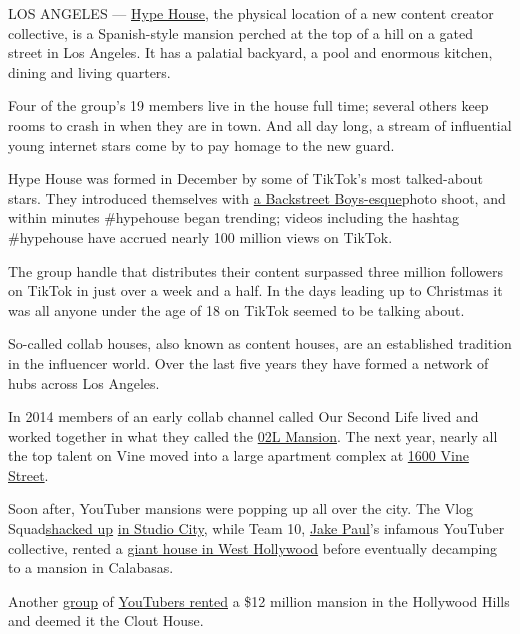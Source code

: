 LOS ANGELES --- \href{https://vm.tiktok.com/CpHWv4/}{Hype House}, the
physical location of a new content creator collective, is a
Spanish-style mansion perched at the top of a hill on a gated street in
Los Angeles. It has a palatial backyard, a pool and enormous kitchen,
dining and living quarters.

Four of the group's 19 members live in the house full time; several
others keep rooms to crash in when they are in town. And all day long, a
stream of influential young internet stars come by to pay homage to the
new guard.

Hype House was formed in December by some of TikTok's most talked-about
stars. They introduced themselves with
\href{https://www.instagram.com/p/B6gMaDaldmf/}{a Backstreet
Boys-esque}photo shoot, and within minutes \#hypehouse began trending;
videos including the hashtag \#hypehouse have accrued nearly 100 million
views on TikTok.

The group handle that distributes their content surpassed three million
followers on TikTok in just over a week and a half. In the days leading
up to Christmas it was all anyone under the age of 18 on TikTok seemed
to be talking about.

So-called collab houses, also known as content houses, are an
established tradition in the influencer world. Over the last five years
they have formed a network of hubs across Los Angeles.

In 2014 members of an early collab channel called Our Second Life lived
and worked together in what they called the
\href{https://www.youtube.com/watch?v=2aVoaohvQK8}{02L Mansion}. The
next year, nearly all the top talent on Vine moved into a large
apartment complex at
\href{https://www.nytimes.com/2017/12/30/business/hollywood-apartment-social-media.html}{1600
Vine Street}.

Soon after, YouTuber mansions were popping up all over the city. The
Vlog Squad\href{https://www.youtube.com/watch?v=n1_PSUJCz5I}{shacked up}
\href{https://www.velvetropes.com/backstage/david-dobrik-house/}{in
Studio City}, while Team 10,
\href{https://www.nytimes.com/2017/09/08/fashion/jake-paul-team-10-youtube.html}{Jake
Paul}'s infamous YouTuber collective, rented a
\href{https://www.mic.com/articles/183081/meet-the-teens-and-parents-who-spend-hours-standing-in-the-hot-sun-outside-jake-pauls-house}{giant
house in West Hollywood} before eventually decamping to a mansion in
Calabasas.

Another
\href{https://www.wetheunicorns.com/features/clout-house-price-members-pictures/}{group}
of \href{https://www.vlogfund.com/en/blog/clout-house/}{YouTubers
rented} a \$12 million mansion in the Hollywood Hills and deemed it the
Clout House.

